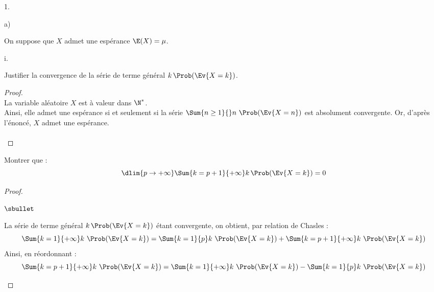 \begin{noliste}{1.}
\newpage


\item 
  \begin{noliste}{a)}
  \item On suppose que $X$ admet une espérance $\E(X)= \mu$.
    \begin{nonoliste}{i.}
    \item Justifier la convergence de la série de terme général $k \,
      \Prob(\Ev{X=k})$.
      
      \begin{proof}~\\
        La variable aléatoire $X$ est à valeur dans $\N^*$.\\
        Ainsi, elle admet une espérance si et seulement si la série
        $\Sum{n \geq 1}{} n \ \Prob(\Ev{X = n})$ est absolument
        convergente. Or, d'après l'énoncé, $X$ admet une espérance. \\[-.8cm]%
        ~\\[-.5cm]
      \end{proof}

    \item Montrer que : 
      \[
      \dlim{p \to +\infty} \Sum{k=p+1}{+\infty} k \, \Prob(\Ev{X=k})=0
      \]
      
      \begin{proof}~%
        \begin{noliste}{$\sbullet$}
        \item La série de terme général $k \, \Prob(\Ev{X=k})$ étant
          convergente, on obtient, par relation de Chasles :
          \[
          \Sum{k = 1}{+\infty} k \ \Prob(\Ev{X = k}) = \Sum{k = 1}{p}
          k \ \Prob(\Ev{X = k}) + \Sum{k = p+1}{+\infty} k \
          \Prob(\Ev{X = k})
          \]
          Ainsi, en réordonnant :
          \[
          \Sum{k = p+1}{+\infty} k \ \Prob(\Ev{X = k}) = \Sum{k =
            1}{+\infty} k \ \Prob(\Ev{X = k}) - \Sum{k = 1}{p} k \
          \Prob(\Ev{X = k})
          \]


\end{noliste}
\end{proof}
\end{nonoliste}
\end{noliste}
\end{noliste}
